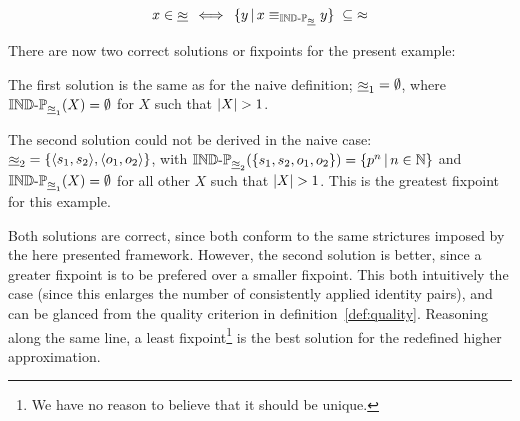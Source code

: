 \begin{definition}
\label{def:identity_lower_approximation_fixpoint}
\begin{align}
  x \in \underline{\approx}
\, \iff \,
    \{y\,\vert\,x \equiv_{\operatorname{{\mathbb{IND}-\mathbb{P}}}_{\underline{\approx}}} y\}
  \; \subseteq \;
    \approx\nonumber
\end{align}
\end{definition}

\noindent There are now two correct solutions or fixpoints
  for the present example:

The first solution is the same as for the naive definition;
  $\underline{\approx}_1 = \emptyset$,
  where $\operatorname{{\mathbb{IND}-\mathbb{P}}}_{\underline{\approx}_1}(X) = \emptyset$
  for $X$ such that $\lvert X\rvert > 1$.

The second solution could not be derived in the naive case:
  $\underline{\approx}_2 = \{\langle s_1,s_2\rangle,\langle o_1,o_2\rangle\}$,
  with $\operatorname{{\mathbb{IND}-\mathbb{P}}}_{\underline{\approx}_2}(\{s_1,s_2,o_1,o_2\}) = \{p^n\,\vert\,n \in \mathbb{N}\}$
  and $\operatorname{{\mathbb{IND}-\mathbb{P}}}_{\underline{\approx}_1}(X) = \emptyset$
  for all other $X$ such that $\lvert X\rvert > 1$.
This is the greatest fixpoint for this example.

Both solutions are correct,
  since both conform to the same strictures imposed by the here presented
  framework.
However, the second solution is better, since a greater fixpoint is
  to be prefered over a smaller fixpoint.
This both intuitively the case
  (since this enlarges the number of consistently applied identity pairs),
  and can be glanced from the quality criterion in
  \mbox{definition \ref{def:quality}}.
Reasoning along the same line,
  a least fixpoint\footnote{
      We have no reason to believe that it should be unique.
    }
  is the best solution for the redefined higher approximation.
